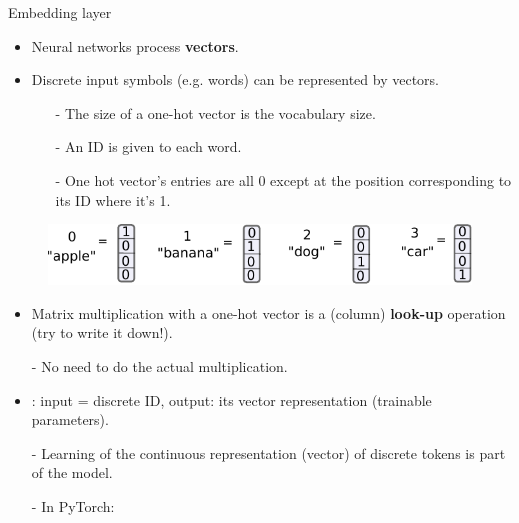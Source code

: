 \begin{frame}{Embedding layer}
\vspace{-5mm}
\begin{itemize}
\item Neural networks process \textbf{vectors}.
\item Discrete input symbols (e.g. words) can be represented by  vectors.
\begin{itemize}
\item[-] The size of a one-hot vector is the vocabulary size.
\item[-] An ID is given to each word.
\item[-] One hot vector's entries are all 0 except at the position corresponding to its ID where it's 1.
\end{itemize}

\end{itemize}
\begin{figure}
\centering
\includegraphics[width=.7\linewidth]{./figures/emb.pdf}
\end{figure}
\vsp
\begin{itemize}
\item Matrix multiplication with a one-hot vector is a (column) \textbf{look-up} operation (try to write it down!).
\item[-] No need to do the actual multiplication. 
\item {}: input = discrete ID, output: its vector representation (trainable parameters).
\item[-] Learning of the continuous representation (vector) of discrete tokens is part of the model.
\item[-] In PyTorch: 
\end{itemize}
\end{frame}


